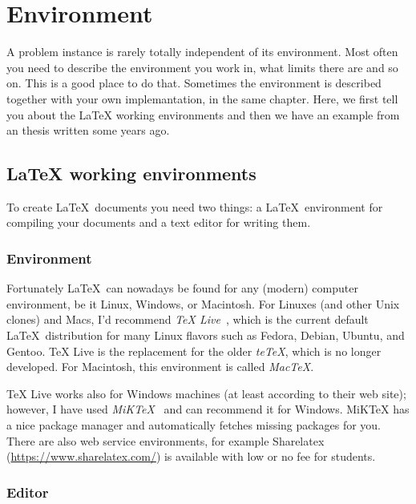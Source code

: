 \chapter{Environment}
\label{chapter:environment}

A problem instance is rarely totally independent of its environment.
Most often you need to describe the environment you work in, what
limits there are and so on. This is a good place to do that. Sometimes
the environment is described together with your own implemantation, in
the same chapter. Here, we first tell you about the LaTeX working
environments and then we have an example from an thesis written some years
ago.


\section{LaTeX working environments}
\label{section:environments}

To create \LaTeX\ documents you need two things: a \LaTeX\ environment for
compiling your documents and a text editor for writing them.

\subsection{Environment}

Fortunately \LaTeX\ can nowadays be found for any (modern) computer
environment, be it Linux, Windows, or Macintosh.
For Linuxes (and other Unix clones) and Macs, I'd recommend \emph{TeX
Live}~\cite{TeXLive}, which is the current default \LaTeX\ distribution for
many Linux flavors such as Fedora, Debian, Ubuntu, and Gentoo.
TeX Live is the replacement for the older \emph{teTeX}, which is
no longer developed. For Macintosh, this environment is called \emph{MacTeX}.

TeX Live works also for Windows machines (at least according to their web
site); however, I have used \emph{MiKTeX}~\cite{MiKTeX} and can recommend it
for Windows. 
MiKTeX has a nice package manager and automatically fetches missing packages
for you. There are also web service environments, for example
Sharelatex (\url{https://www.sharelatex.com/}) is available with low
or no fee for students.

\subsection{Editor}

